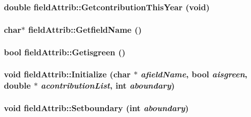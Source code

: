 \label{classfield_attrib_afab6e6148d727d1ce35e1368c3cb08c3}
\hypertarget{classfield_attrib_a42dd5454a9138b86b2eadbbc8ebbda67}{
\subsubsection[{GetcontributionThisYear}]{\setlength{\rightskip}{0pt plus 5cm}double fieldAttrib::GetcontributionThisYear (void)}}
\label{classfield_attrib_a42dd5454a9138b86b2eadbbc8ebbda67}
\hypertarget{classfield_attrib_a395c4971a644d511ae28591c5d3ccabc}{
\subsubsection[{GetfieldName}]{\setlength{\rightskip}{0pt plus 5cm}char$\ast$ fieldAttrib::GetfieldName ()}}
\label{classfield_attrib_a395c4971a644d511ae28591c5d3ccabc}
\hypertarget{classfield_attrib_a3de94bc37fc2f61ec3b759c6948f5db3}{
\subsubsection[{Getisgreen}]{\setlength{\rightskip}{0pt plus 5cm}bool fieldAttrib::Getisgreen ()}}
\label{classfield_attrib_a3de94bc37fc2f61ec3b759c6948f5db3}
\hypertarget{classfield_attrib_a7932fac29193dc92b2890dfe7c14b317}{
\subsubsection[{Initialize}]{\setlength{\rightskip}{0pt plus 5cm}void fieldAttrib::Initialize (char $\ast$ {\em afieldName}, \/  bool {\em aisgreen}, \/  double $\ast$ {\em acontributionList}, \/  int {\em aboundary})}}
\label{classfield_attrib_a7932fac29193dc92b2890dfe7c14b317}
\hypertarget{classfield_attrib_a2e9eb533967cb731f5617795916beece}{
\subsubsection[{Setboundary}]{\setlength{\rightskip}{0pt plus 5cm}void fieldAttrib::Setboundary (int {\em aboundary})}}
